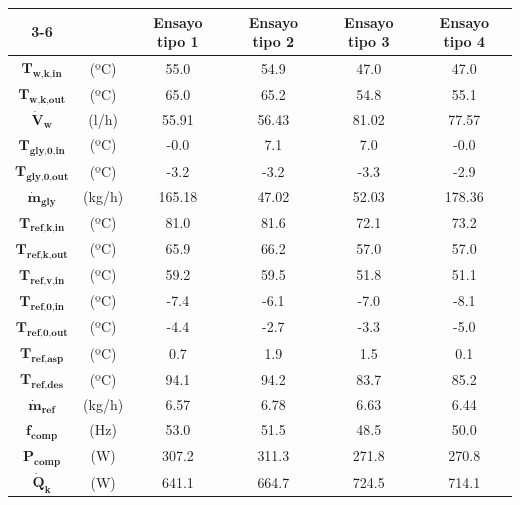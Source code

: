 \documentclass[../main.tex]{subfiles}
\begin{document}
\begin{table}[ht]
\centering
\begin{tabular}{cc|c|c|c|c|}
\cline{3-6}
 & & \textbf{Ensayo tipo 1} & \textbf{Ensayo tipo 2} & \textbf{Ensayo tipo 3} & \textbf{Ensayo tipo 4} \\
\hline
\multicolumn{1}{|c}{$\textbf{T}_\textbf{w,k,in}$} & (ºC) & 55.0 & 54.9 & 47.0 & 47.0 \\
\hline
\multicolumn{1}{|c}{$\textbf{T}_\textbf{w,k,out}$} & (ºC) & 65.0 & 65.2 & 54.8 & 55.1 \\
\hline
\multicolumn{1}{|c}{$\dot{\textbf{V}}_\textbf{w}$} & (l/h) & 55.91 & 56.43 & 81.02 & 77.57 \\
\hline
\multicolumn{1}{|c}{$\textbf{T}_\textbf{gly,0,in}$} & (ºC) & -0.0 & 7.1 & 7.0 & -0.0 \\
\hline
\multicolumn{1}{|c}{$\textbf{T}_\textbf{gly,0,out}$} & (ºC) & -3.2 & -3.2 & -3.3 & -2.9 \\
\hline
\multicolumn{1}{|c}{$\dot{\textbf{m}}_\textbf{gly}$} & (kg/h) & 165.18 & 47.02 & 52.03 & 178.36 \\
\hline
\multicolumn{1}{|c}{$\textbf{T}_\textbf{ref,k,in}$} & (ºC) & 81.0 & 81.6 & 72.1 & 73.2 \\
\hline
\multicolumn{1}{|c}{$\textbf{T}_\textbf{ref,k,out}$} & (ºC) & 65.9 & 66.2 & 57.0 & 57.0 \\
\hline
\multicolumn{1}{|c}{$\textbf{T}_\textbf{ref,v,in}$} & (ºC) & 59.2 & 59.5 & 51.8 & 51.1 \\
\hline
\multicolumn{1}{|c}{$\textbf{T}_\textbf{ref,0,in}$} & (ºC) & -7.4 & -6.1 & -7.0 & -8.1 \\
\hline
\multicolumn{1}{|c}{$\textbf{T}_\textbf{ref,0,out}$} & (ºC) & -4.4 & -2.7 & -3.3 & -5.0 \\
\hline
\multicolumn{1}{|c}{$\textbf{T}_\textbf{ref,asp}$} & (ºC) & 0.7 & 1.9 & 1.5 & 0.1 \\
\hline
\multicolumn{1}{|c}{$\textbf{T}_\textbf{ref,des}$} & (ºC) & 94.1 & 94.2 & 83.7 & 85.2 \\
\hline
\multicolumn{1}{|c}{$\dot{\textbf{m}}_\textbf{ref}$} & (kg/h) & 6.57 & 6.78 & 6.63 & 6.44 \\
\hline
\multicolumn{1}{|c}{$\textbf{f}_\textbf{comp}$} & (Hz) & 53.0 & 51.5 & 48.5 & 50.0 \\
\hline
\multicolumn{1}{|c}{$\textbf{P}_\textbf{comp}$} & (W) & 307.2 & 311.3 & 271.8 & 270.8 \\
\hline
\multicolumn{1}{|c}{$\dot{\textbf{Q}}_\textbf{k}$} & (W) & 641.1 & 664.7 & 724.5 & 714.1 \\

\end{tabular}
\end{table}
\end{document}
